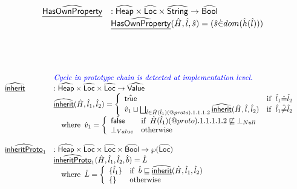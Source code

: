 \[\begin{array}{ll}
\ahf{HasOwnProperty} & : \aHeap \times \aLoc \times \abs{String} \rightarrow \abs{Bool} \\
&  \ahf{HasOwnProperty}(\hat{H},\hat{l},\hat{s}) = (\hat{s} \dot{\in} dom(\hat{h}(\hat{l})))\\
\\
\end{array}
\]
\\\\

\[
\begin{array}{ll}
& {\inblue \textit{Cycle in prototype chain is detected at implementation level.}} \\
\ahf{inherit} & : \aHeap \times \aLoc \times \aLoc \rightarrow \aValue \\
& \ahf{inherit}(\hat{H},\hat{l}_1,\hat{l}_2)
  = \left\{
    \begin{array}{ll}
      \atrue & \ifc{\hat{l}_1 \hat{=} \hat{l}_2} \\
      \hat{v}_1 \sqcup \bigsqcup_{\hat{l}\in \hat{H}(\hat{l}_1)(\varprop{proto}).1.1.1.2} \ahf{inherit}(\hat{H},\hat{l},\hat{l}_2) & \ifc{\hat{l}_1 \hat{\neq} \hat{l}_2} \\
    \end{array}
  \right.\\
& \quad\wherec{
  \hat{v}_1 =
    \left\{
    \begin{array}{ll}
      \afalse & \ifc{\hat{H}(\hat{l}_1)(\varprop{proto}).1.1.1.1.2 \not\sqsubseteq \bot_{Null}}\\
      \bot_{Value} & \owc\\
    \end{array}
    \right.
  }\\
\\

\ahf {inheritProto}_1 &:  \aHeap \times \aLoc \times \aLoc \times \abs{Bool} \rightarrow \powerset{\aLoc}\\
& \ahf {inheritProto}_1 (\hat{H}, \hat{l}_1, \hat{l}_2, \hat{b}) = \hat{L}\\
& \quad \wherec{
  \hat{L} = \left\{
    \begin{array}{ll}
      \{ \hat{l}_1 \} & \ifc{ \hat{b} \sqsubseteq \ahf{inherit}(\hat{H}, \hat{l}_1, \hat{l}_2)}\\
      \{ \} & \owc\\
    \end{array}
  \right.\\
}
\\\\


\end{array}\]
